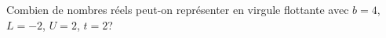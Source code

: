 
\begin{exercice}\label{exoSerieQuatre0004}


Combien de nombres réels peut-on représenter en virgule flottante avec $b=4$, $L=-2$, $U=2$, $t=2$?

\end{exercice}
